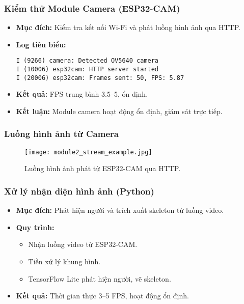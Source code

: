 \begin{frame}[t,fragile]
\frametitle{Kiểm thử Module Camera (ESP32-CAM)}
\begin{itemize}
    \item \textbf{Mục đích:} Kiểm tra kết nối Wi-Fi và phát luồng hình ảnh qua HTTP.
    \item \textbf{Log tiêu biểu:}
    \begin{verbatim}
I (9266) camera: Detected OV5640 camera
I (10006) esp32cam: HTTP server started
I (20006) esp32cam: Frames sent: 50, FPS: 5.87
    \end{verbatim}
    \item \textbf{Kết quả:} FPS trung bình 3.5–5, ổn định.
    \item \textbf{Kết luận:} Module camera hoạt động ổn định, giám sát trực tiếp.
\end{itemize}
\end{frame}

\begin{frame}[t]
\frametitle{Luồng hình ảnh từ Camera}
\begin{figure}
    \centering
    \texttt{[image: module2\_stream\_example.jpg]}
    \caption{Luồng hình ảnh phát từ ESP32-CAM qua HTTP.}
\end{figure}
\end{frame}

\begin{frame}[t]
\frametitle{Xử lý nhận diện hình ảnh (Python)}
\begin{itemize}
    \item \textbf{Mục đích:} Phát hiện người và trích xuất skeleton từ luồng video.
    \item \textbf{Quy trình:}
    \begin{itemize}
        \item Nhận luồng video từ ESP32-CAM.
        \item Tiền xử lý khung hình.
        \item TensorFlow Lite phát hiện người, vẽ skeleton.
    \end{itemize}
    \item \textbf{Kết quả:} Thời gian thực 3–5 FPS, hoạt động ổn định.
\end{itemize}
\end{frame}

